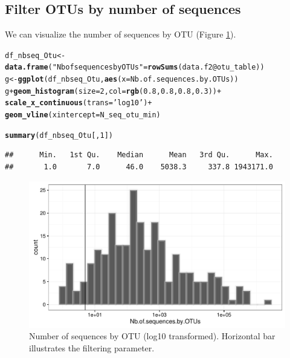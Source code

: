 \documentclass[12pt]{article}\usepackage[]{graphicx}\usepackage[]{color}
\makeatletter
\def\maxwidth{ %
  \ifdim\Gin@nat@width>\linewidth
    \linewidth
  \else
    \Gin@nat@width
  \fi
}
\newcommand{\hlnum}[1]{\textcolor[rgb]{0.686,0.059,0.569}{#1}}%
\newcommand{\hlstr}[1]{\textcolor[rgb]{0.192,0.494,0.8}{#1}}%
\newcommand{\hlopt}[1]{\textcolor[rgb]{0,0,0}{#1}}%
\newcommand{\hlstd}[1]{\textcolor[rgb]{0.345,0.345,0.345}{#1}}%
\newcommand{\hlkwb}[1]{\textcolor[rgb]{0.69,0.353,0.396}{#1}}%
\newcommand{\hlkwc}[1]{\textcolor[rgb]{0.333,0.667,0.333}{#1}}%
\newcommand{\hlkwd}[1]{\textcolor[rgb]{0.737,0.353,0.396}{\textbf{#1}}}%
\newenvironment{kframe}{%
 \def\at@end@of@kframe{}%
 \ifinner\ifhmode%
  \def\at@end@of@kframe{\end{minipage}}%
  \begin{minipage}{\columnwidth}%
 \fi\fi%
 \def\FrameCommand##1{\hskip\@totalleftmargin \hskip-\fboxsep
 \colorbox{shadecolor}{##1}\hskip-\fboxsep
     \hskip-\linewidth \hskip-\@totalleftmargin \hskip\columnwidth}%
 \MakeFramed {\advance\hsize-\width
   \@totalleftmargin\z@ \linewidth\hsize
   \@setminipage}}%
 {\par\unskip\endMakeFramed%
 \at@end@of@kframe}
\newenvironment{knitrout}{}{} %
\numberwithin{figure}{section}
\makeatother
\begin{document}
 \subsection{Filter OTUs by number of sequences}

 We can visualize the number of sequences by OTU (Figure \ref{fig:nbseq_Otu}).

\begin{knitrout}\small
{}\color{fgcolor}\begin{kframe}
\begin{alltt}
\hlstd{df_nbseq_Otu} \hlkwb{<-} \hlkwd{data.frame}\hlstd{(}\hlstr{"Nb of sequences by OTUs"} \hlstd{=} \hlkwd{rowSums}\hlstd{(data.f2}\hlopt{@}\hlkwc{otu_table}\hlstd{))}
\hlstd{g} \hlkwb{<-} \hlkwd{ggplot}\hlstd{(df_nbseq_Otu,} \hlkwd{aes}\hlstd{(}\hlkwc{x} \hlstd{= Nb.of.sequences.by.OTUs))}
\hlstd{g} \hlopt{+} \hlkwd{geom_histogram}\hlstd{(}\hlkwc{size} \hlstd{=} \hlnum{2}\hlstd{,} \hlkwc{col} \hlstd{=} \hlkwd{rgb}\hlstd{(}\hlnum{0.8}\hlstd{,} \hlnum{0.8}\hlstd{,} \hlnum{0.8}\hlstd{,} \hlnum{0.3}\hlstd{))} \hlopt{+}
  \hlkwd{scale_x_continuous}\hlstd{(}\hlkwc{trans} \hlstd{=} \hlstr{'log10'}\hlstd{)} \hlopt{+}
  \hlkwd{geom_vline}\hlstd{(}\hlkwc{xintercept}\hlstd{= N_seq_otu_min)}
\end{alltt}


{\ttfamily\noindent\itshape\color{messagecolor}{\#\# `stat\_bin()` using `bins = 30`. Pick better value with `binwidth`.}}\begin{alltt}
\hlkwd{summary}\hlstd{(df_nbseq_Otu[,} \hlnum{1}\hlstd{])}
\end{alltt}
\begin{verbatim}
##      Min.   1st Qu.    Median      Mean   3rd Qu.      Max. 
##       1.0       7.0      46.0    5038.3     337.8 1943171.0
\end{verbatim}
\end{kframe}\begin{figure}

{\centering \includegraphics[width=\maxwidth]{figure/nbseq_Otu-1} 

}

\caption[Number of sequences by OTU (log10 transformed)]{Number of sequences by OTU (log10 transformed). Horizontal bar illustrates the filtering parameter.}\label{fig:nbseq_Otu}
\end{figure}


\end{knitrout}
\end{document}
